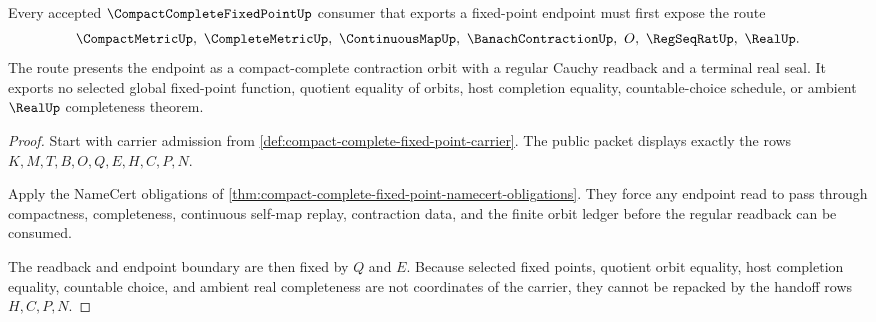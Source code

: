 \begin{theorem}
\label{thm:compact-complete-fixed-point-cauchy-orbit-route}
Every accepted $\CompactCompleteFixedPointUp$ consumer that exports a fixed-point endpoint must first expose the route
$$
\CompactMetricUp,\ \CompleteMetricUp,\ \ContinuousMapUp,\ \BanachContractionUp,\ O,\ \RegSeqRatUp,\ \RealUp .
$$
The route presents the endpoint as a compact-complete contraction orbit with a regular Cauchy readback and a terminal real seal. It exports no selected global fixed-point function, quotient equality of orbits, host completion equality, countable-choice schedule, or ambient $\RealUp$ completeness theorem.
\end{theorem}
\begin{proof}
Start with carrier admission from \autoref{def:compact-complete-fixed-point-carrier}. The public packet displays exactly the rows $K,M,T,B,O,Q,E,H,C,P,N$.

Apply the NameCert obligations of \autoref{thm:compact-complete-fixed-point-namecert-obligations}. They force any endpoint read to pass through compactness, completeness, continuous self-map replay, contraction data, and the finite orbit ledger before the regular readback can be consumed.

The readback and endpoint boundary are then fixed by $Q$ and $E$. Because selected fixed points, quotient orbit equality, host completion equality, countable choice, and ambient real completeness are not coordinates of the carrier, they cannot be repacked by the handoff rows $H,C,P,N$.
\end{proof}





